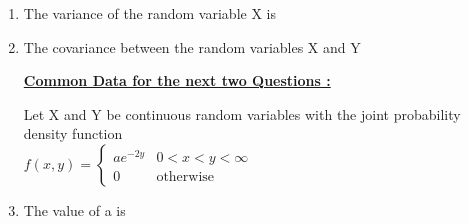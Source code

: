 \documentclass[journal,12pt,twocolumn]{IEEEtran}
\begin{document}
\begin{enumerate}
\item The variance of the random variable X is 

\begin{enumerate}
\end{enumerate}

\item The covariance between the random variables X and Y

\begin{enumerate}
\end{enumerate}


\begin{center}
\centering\underline{\textbf{Common Data for the next two  Questions :}}
\end{center}

Let X and Y be continuous random variables with the joint probability density function \\

$
f(x,y)=
\begin{cases}
a{e^{-2y}}
& 0 <x<y< \infty \\
0 & \text{otherwise}
\end{cases}
$

\item The value of a is

\begin{enumerate}
\end{enumerate}
\end{enumerate}
\end{document}
